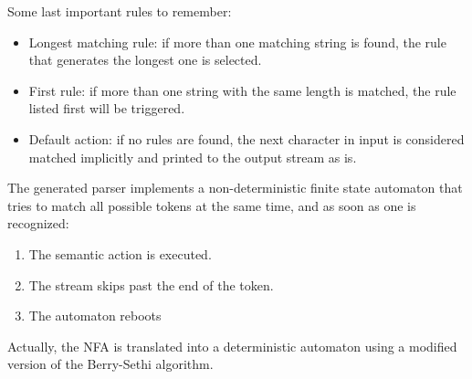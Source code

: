 \documentclass[12pt, a4paper]{report}
\newtheorem[style=M, bodystyle=\normalfont]{operation}{Operation}
\newtheorem[style=M, bodystyle=\normalfont]{theorem}{Theorem}
\newtheorem[style=M, bodystyle=\normalfont]{corollary}{Corollary}
\newtheorem[style=M, bodystyle=\normalfont]{lemma}{Lemma}
\newtheorem[style=M, bodystyle=\normalfont]{definition}{Definition}
\begin{document}
    Some last important rules to remember:
    \begin{itemize}
        \item Longest matching rule: if more than one matching string is found, the rule that generates the longest one is selected. 
        \item First rule: if more than one string with the same length is matched, the rule listed first will be triggered. 
        \item Default action: if no rules are found, the next character in input is considered matched implicitly and printed to the output stream as is.
    \end{itemize}

    The generated parser implements a non-deterministic finite state automaton that tries to match all possible tokens at the same time, and as soon as one is recognized:
    \begin{enumerate}
        \item The semantic action is executed. 
        \item The stream skips past the end of the token. 
        \item The automaton reboots
    \end{enumerate}
    Actually, the NFA is translated into a deterministic automaton using a modified version of the Berry-Sethi algorithm. 
\end{document}
